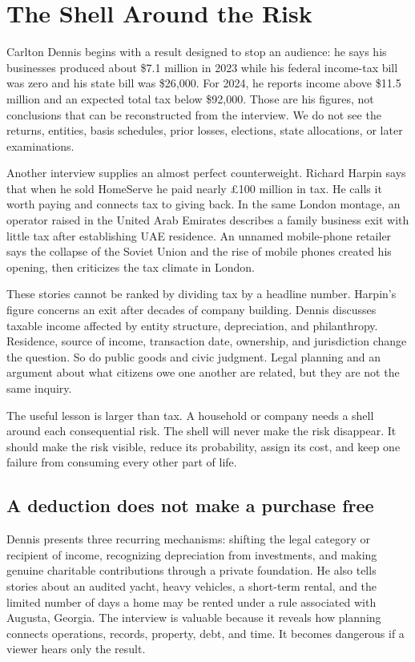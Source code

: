 \chapter{The Shell Around the Risk}

Carlton Dennis begins with a result designed to stop an audience: he says his
businesses produced about \$7.1 million in 2023 while his federal income-tax
bill was zero and his state bill was \$26,000. For 2024, he reports income above
\$11.5 million and an expected total tax below \$92,000. Those are his figures,
not conclusions that can be reconstructed from the interview. We do not see
the returns, entities, basis schedules, prior losses, elections, state
allocations, or later examinations.

Another interview supplies an almost perfect counterweight. Richard Harpin
says that when he sold HomeServe he paid nearly \pounds100 million in tax. He
calls it worth paying and connects tax to giving back. In the same London
montage, an operator raised in the United Arab Emirates describes a family
business exit with little tax after establishing UAE residence. An unnamed
mobile-phone retailer says the collapse of the Soviet Union and the rise of
mobile phones created his opening, then criticizes the tax climate in London.

These stories cannot be ranked by dividing tax by a headline number. Harpin's
figure concerns an exit after decades of company building. Dennis discusses
taxable income affected by entity structure, depreciation, and philanthropy.
Residence, source of income, transaction date, ownership, and jurisdiction
change the question. So do public goods and civic judgment. Legal planning and
an argument about what citizens owe one another are related, but they are not
the same inquiry.

The useful lesson is larger than tax. A household or company needs a shell
around each consequential risk. The shell will never make the risk disappear.
It should make the risk visible, reduce its probability, assign its cost, and
keep one failure from consuming every other part of life.

\section{A deduction does not make a purchase free}

Dennis presents three recurring mechanisms: shifting the legal category or
recipient of income, recognizing depreciation from investments, and making
genuine charitable contributions through a private foundation. He also tells
stories about an audited yacht, heavy vehicles, a short-term rental, and the
limited number of days a home may be rented under a rule associated with
Augusta, Georgia. The interview is valuable because it reveals how planning
connects operations, records, property, debt, and time. It becomes dangerous
if a viewer hears only the result.


